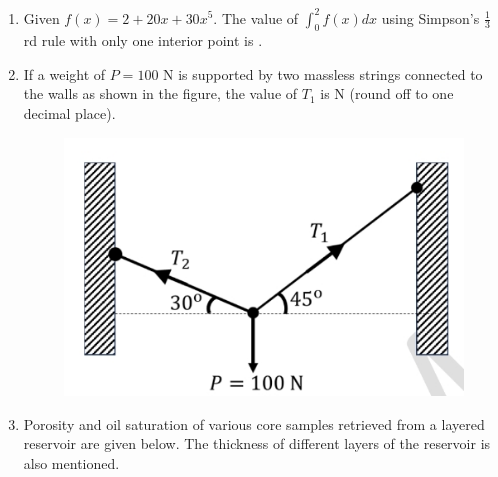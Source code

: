 \documentclass[journal,12pt,onecolumn]{IEEEtran}
\theoremstyle{remark}
\begin{document}
\begin{enumerate}
\item  Given $f(x) = 2 + 20x + 30x^5$. The value of $\int_0^2 f(x) dx$ using Simpson's $\frac{1}{3}$rd rule with only one interior point is \underline{\hspace{1cm}}.
\begin{enumerate}
\end{enumerate}
\hfill{}



\item  If a weight of $P = 100$ N is supported by two massless strings connected to the walls as shown in the figure, the value of $T_1$ is \underline{\hspace{1cm}} N (round off to one decimal place).
\begin{figure}[h]
    \centering
    \includegraphics[width=0.5\columnwidth]{figs/im 13.jpeg}
    \caption{}
    \label{fig:placeholder}
\end{figure}

\begin{enumerate}
\end{enumerate}
\hfill{}



\item  Porosity and oil saturation of various core samples retrieved from a layered reservoir are given below. The thickness of different layers of the reservoir is also mentioned.


\end{enumerate}
\end{document}
